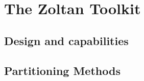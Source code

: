 %
%
%
\chapter{The Zoltan Toolkit}

\section{Design and capabilities}

\section{Partitioning Methods}
